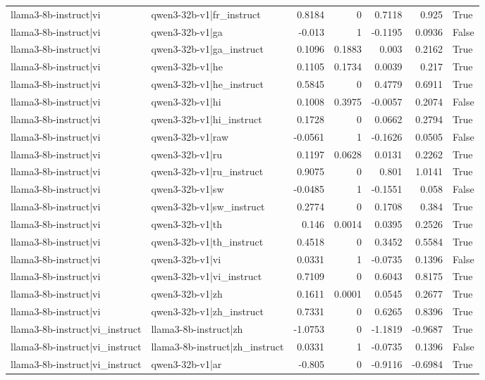 \begin{table}
\begin{tabular}{l l r r r r l}
llama3-8b-instruct|vi & qwen3-32b-v1|fr_instruct & 0.8184 & 0 & 0.7118 & 0.925 & True \\
llama3-8b-instruct|vi & qwen3-32b-v1|ga & -0.013 & 1 & -0.1195 & 0.0936 & False \\
llama3-8b-instruct|vi & qwen3-32b-v1|ga_instruct & 0.1096 & 0.1883 & 0.003 & 0.2162 & True \\
llama3-8b-instruct|vi & qwen3-32b-v1|he & 0.1105 & 0.1734 & 0.0039 & 0.217 & True \\
llama3-8b-instruct|vi & qwen3-32b-v1|he_instruct & 0.5845 & 0 & 0.4779 & 0.6911 & True \\
llama3-8b-instruct|vi & qwen3-32b-v1|hi & 0.1008 & 0.3975 & -0.0057 & 0.2074 & False \\
llama3-8b-instruct|vi & qwen3-32b-v1|hi_instruct & 0.1728 & 0 & 0.0662 & 0.2794 & True \\
llama3-8b-instruct|vi & qwen3-32b-v1|raw & -0.0561 & 1 & -0.1626 & 0.0505 & False \\
llama3-8b-instruct|vi & qwen3-32b-v1|ru & 0.1197 & 0.0628 & 0.0131 & 0.2262 & True \\
llama3-8b-instruct|vi & qwen3-32b-v1|ru_instruct & 0.9075 & 0 & 0.801 & 1.0141 & True \\
llama3-8b-instruct|vi & qwen3-32b-v1|sw & -0.0485 & 1 & -0.1551 & 0.058 & False \\
llama3-8b-instruct|vi & qwen3-32b-v1|sw_instruct & 0.2774 & 0 & 0.1708 & 0.384 & True \\
llama3-8b-instruct|vi & qwen3-32b-v1|th & 0.146 & 0.0014 & 0.0395 & 0.2526 & True \\
llama3-8b-instruct|vi & qwen3-32b-v1|th_instruct & 0.4518 & 0 & 0.3452 & 0.5584 & True \\
llama3-8b-instruct|vi & qwen3-32b-v1|vi & 0.0331 & 1 & -0.0735 & 0.1396 & False \\
llama3-8b-instruct|vi & qwen3-32b-v1|vi_instruct & 0.7109 & 0 & 0.6043 & 0.8175 & True \\
llama3-8b-instruct|vi & qwen3-32b-v1|zh & 0.1611 & 0.0001 & 0.0545 & 0.2677 & True \\
llama3-8b-instruct|vi & qwen3-32b-v1|zh_instruct & 0.7331 & 0 & 0.6265 & 0.8396 & True \\
llama3-8b-instruct|vi_instruct & llama3-8b-instruct|zh & -1.0753 & 0 & -1.1819 & -0.9687 & True \\
llama3-8b-instruct|vi_instruct & llama3-8b-instruct|zh_instruct & 0.0331 & 1 & -0.0735 & 0.1396 & False \\
llama3-8b-instruct|vi_instruct & qwen3-32b-v1|ar & -0.805 & 0 & -0.9116 & -0.6984 & True \\

\end{tabular}
\end{table}
